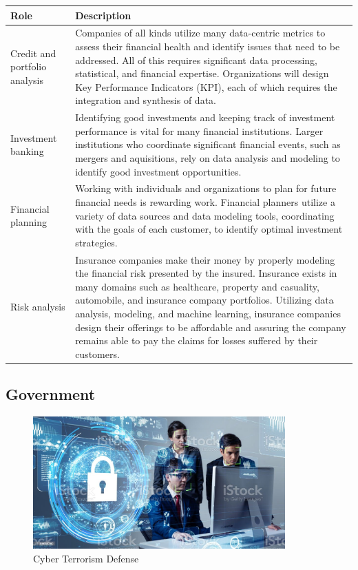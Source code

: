\begin{table}[H]
	\begin{center}
		\begin{tabular}{p{1in}|p{3.4in}} 
			\textbf{Role} & \textbf{Description}\\
			\hline
			Credit and portfolio analysis & Companies of all kinds utilize many data-centric metrics to assess their financial health and identify issues that need to be addressed. All of this requires significant data processing, statistical, and financial expertise. Organizations will design Key Performance Indicators (KPI), each of which requires the integration and synthesis of data.\\
			\hline
			Investment banking & Identifying good investments and keeping track of investment performance is vital for many financial institutions. Larger institutions who coordinate significant financial events, such as mergers and aquisitions, rely on data analysis and modeling to identify good investment opportunities.\\
			\hline
			Financial planning & Working with individuals and organizations to plan for future financial needs is rewarding work. Financial planners utilize a variety of data sources and data modeling  tools, coordinating with the goals of each customer, to identify optimal investment strategies.\\
			\hline
			Risk analysis & Insurance companies make their money by properly modeling the financial risk presented by the insured. Insurance exists in many domains such as healthcare, property and casuality, automobile, and insurance company portfolios. Utilizing data analysis, modeling, and machine learning, insurance companies design their offerings to be affordable and assuring the company remains able to pay the claims for losses suffered by their customers.\\
			\hline
		\end{tabular}
	\end{center}
\end{table}

\subsection{Government}

\begin{figure}[H]
	\begin{center}
		\caption{Cyber Terrorism Defense}
		\vskip 4pt
		\includegraphics[height=2in]{images/careers/istockphoto-1169668290-1024x1024.jpg}
	\end{center}
\end{figure}

